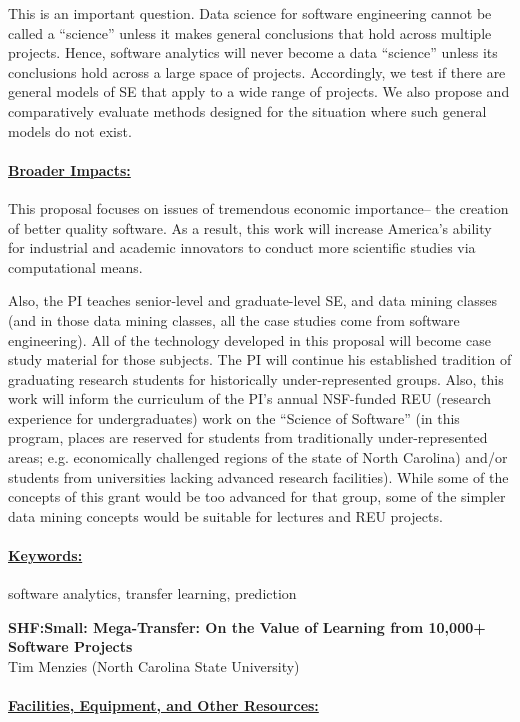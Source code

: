 \documentclass[10pt,letterpaper]{article}
\newcommand\myTitle{\newpage
\begin{center}
{\bf SHF:Small: Mega-Transfer: On the Value of Learning from 10,000+ Software Projects}\\
Tim Menzies (North Carolina State University)
\end{center}}
\newcommand\head[1]{\paragraph{\underline{#1}}}
\begin{document}
This is an important question.
  Data science for software engineering
cannot be called a ``science'' unless
it makes general conclusions that hold across
multiple projects. Hence,  software analytics will never become a data ``science''
unless its  conclusions hold across a large space of projects. 
Accordingly, we test if there are general models of SE that apply to a wide range of projects.  
We also  propose and comparatively evaluate  methods designed for the situation where   such general models do not exist.
 

\head{Broader Impacts:}
This proposal focuses on issues of
tremendous economic importance--  the creation of better quality software.
As a result, this work will increase America's ability for industrial and academic innovators to conduct
more scientific studies via computational means.  
 

Also, the PI teaches senior-level and graduate-level SE, and data mining classes (and in those data mining classes, all the case studies come from software engineering).  All of the technology developed in this proposal will become case study material for those subjects.   The PI will continue his established tradition of graduating  research  students  for  historically  under-represented  groups.   Also, this work will inform the curriculum of the PI's annual
   NSF-funded REU (research experience for undergraduates) work on  the ``Science of Software''
   (in  this program, places are reserved for students from traditionally under-represented areas; e.g.  economically challenged regions of the state of North Carolina) and/or students from universities lacking advanced research facilities). While some of the concepts of this grant would be too advanced for that group, some of the simpler data mining concepts would be suitable for lectures and REU projects.


\head{Keywords:} software analytics, transfer learning,  prediction
\newpage
\pagestyle{plain}

\setcounter{page}{1}
\renewcommand{\thepage} {D--\arabic{page}}
\myTitle



\newpage
\head{Facilities, Equipment, and Other Resources:}


\newpage


\end{document}
